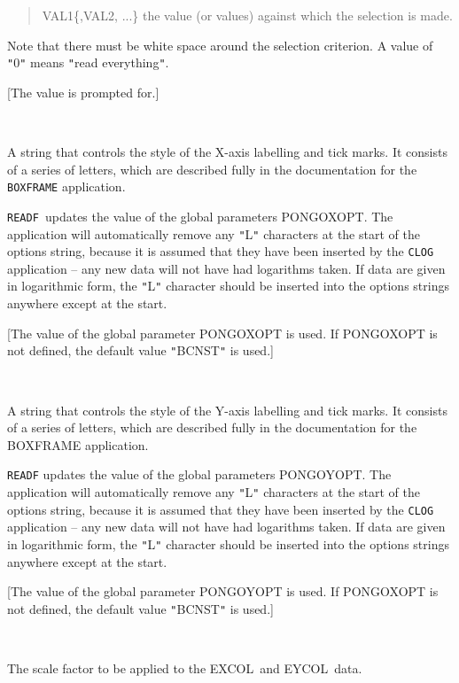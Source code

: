 \documentclass[twoside,11pt]{article}
\newcommand{\htmlref}[2]{#1}
\renewcommand{\_}{\texttt{\symbol{95}}}
\newcommand{\excol}{{\sf EXCOL}}
\newcommand{\eycol}{{\sf EYCOL}}
\newcommand{\cnam}[1]{{\tt #1}}
\newcommand{\iref} [1]{\htmlref{#1}{#1}}
\newcommand{\sstsubsection}[1]{ \item[{#1}] \mbox{} \\}
\newcommand{\sstitem}{\item}
\newcommand{\sstsubsection}[1]{\item[{#1}]}
\newcommand{\sstitem}{\item}
\begin{document}
\begin{sloppypar}
{{{\begin{quote}
{            \sstitem
               VAL1\{,VAL2, ...\} the value (or values) against which the
               selection is made.

         }
         \end{quote}

         Note that there must be white space around the selection
         criterion. A value of {\tt "}0{\tt "} means {\tt "}read everything{\tt "}.

         [The value is prompted for.]
      }
      \sstsubsection{
         XOPT = \_CHAR (Read and Write)
      }{
         A string that controls the style of the X-axis labelling and
         tick marks. It consists of a series of letters, which are
         described fully in the documentation for the \cnam{\iref{BOXFRAME}}
         application.

         \cnam{READF }updates the value of the global parameters PONGO\_XOPT.
         The application will automatically remove any {\tt "}L{\tt "} characters
         at the start of the options string, because it is assumed
         that they have been inserted by the \cnam{\iref{CLOG}} application -- any
         new data will not have had logarithms taken.  If data are
         given in logarithmic form, the {\tt "}L{\tt "} character should be
         inserted into the options strings anywhere except at the
         start.

         [The value of the global parameter PONGO\_XOPT is used. If
         PONGO\_XOPT is not defined, the default value {\tt "}BCNST{\tt "} is used.]
      }
      \sstsubsection{
         YOPT = \_CHAR (Read and Write)
      }{
         A string that controls the style of the Y-axis labelling and
         tick marks. It consists of a series of letters, which are
         described fully in the documentation for the BOXFRAME
         application.

         \cnam{READF} updates the value of the global parameters PONGO\_YOPT.
         The application will automatically remove any {\tt "}L{\tt "} characters
         at the start of the options string, because it is assumed
         that they have been inserted by the \cnam{CLOG} application -- any
         new data will not have had logarithms taken.  If data are
         given in logarithmic form, the {\tt "}L{\tt "} character should be
         inserted into the options strings anywhere except at the
         start.

         [The value of the global parameter PONGO\_YOPT is used. If
         PONGO\_XOPT is not defined, the default value {\tt "}BCNST{\tt "} is used.]
      }
      \sstsubsection{
         ERSCALE = \_REAL (Read)
      }{
         The scale factor to be applied to the \excol\ and \eycol\ data.

}}}
\end{sloppypar}
\end{document}
